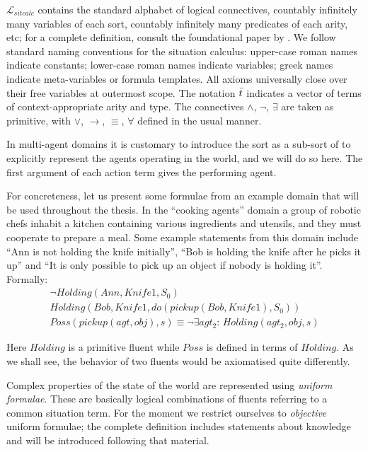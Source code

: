$\mathcal{L}_{sitcalc}$ contains the standard alphabet of logical
connectives, countably infinitely many variables of each sort, countably
infinitely many predicates of each arity, etc; for a complete definition,
consult the foundational paper by \citet{pirri99contributions_sitcalc}.
We follow standard naming conventions for the situation calculus:
upper-case roman names indicate constants; lower-case roman names
indicate variables; greek names indicate meta-variables or formula
templates. All axioms universally close over their free variables
at outermost scope. The notation $\bar{t}$ indicates a vector of
terms of context-appropriate arity and type. The connectives $\wedge$,
$\neg$, $\exists$ are taken as primitive, with $\vee$, $\rightarrow$,
$\equiv$, $\forall$ defined in the usual manner.

In multi-agent domains it is customary to introduce the sort as a sub-sort of  to explicitly represent the agents
operating in the world, and we will do so here. The first argument
of each action term gives the performing agent.

\medskip{}


For concreteness, let us present some formulae from an example domain
that will be used throughout the thesis. In the {}``cooking agents''
domain a group of robotic chefs inhabit a kitchen containing various
ingredients and utensils, and they must cooperate to prepare a meal.
Some example statements from this domain include {}``Ann is not holding
the knife initially'', {}``Bob is holding the knife after he picks
it up'' and {}``It is only possible to pick up an object if nobody
is holding it''. Formally:\begin{gather*}
\neg Holding(Ann,Knife1,S_{0})\\
Holding(Bob,Knife1,do(pickup(Bob,Knife1),S_{0}))\\
Poss(pickup(agt,obj),s)\equiv\neg\exists agt_{2}:\, Holding(agt_{2},obj,s)\end{gather*}


\medskip{}


Here $Holding$ is a primitive fluent while $Poss$ is defined in
terms of $Holding$. As we shall see, the behavior of two fluents
would be axiomatised quite differently.

\medskip{}
 Complex properties of the state of the world are represented using
\emph{uniform formulae}. These are basically logical combinations
of fluents referring to a common situation term. For the moment we
restrict ourselves to \emph{objective} uniform formulae; the complete
definition includes statements about knowledge and will be introduced
following that material.

